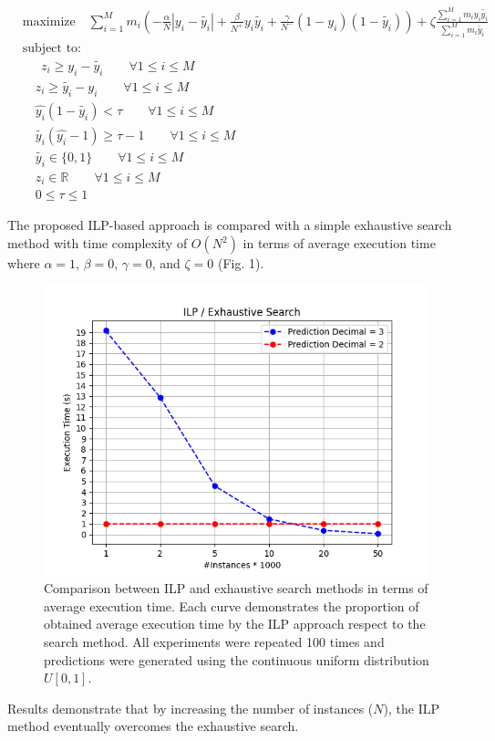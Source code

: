\documentclass[a4paper]{article}
\begin{document}
\begin{equation}
\label{improved_ilp}
\begin{aligned}
&\text{maximize} \quad \sum_{i=1}^{M} m_i \left(-\frac{\alpha}{N}|y_i -\tilde{y_i}| + \frac{\beta}{N^+} y_i \tilde{y_i} + \frac{\gamma}{N^-} (1-y_i) (1-\tilde{y_i})\right) + \zeta \frac{\sum_{i=1}^{M} m_i y_i \tilde{y_i}}{\sum_{i=1}^{M} m_i \tilde{y_i}}\\
&\text{subject to:}\\
&\quad \: \: z_i \ge y_i - \tilde{y_i} \qquad \forall 1\le i \le M \qquad\\
& \quad z_i \ge \tilde{y_i}  - y_i \qquad \forall 1\le i \le M \qquad\\
& \quad \hat{y_i} (1 - \tilde{y_i}) < \tau \qquad \forall 1\le i \le M \qquad\\
& \quad  \tilde{y_i} (\hat{y_i} - 1) \ge \tau - 1 \qquad \forall 1\le i \le M \qquad\\
& \quad \tilde{y_i} \in \{0, 1\} \qquad \forall 1\le i \le M \\
& \quad z_i \in \mathbb{R} \qquad \forall 1\le i \le M \\
& \quad  0 \le \tau \le 1
\end{aligned}
\end{equation}

The proposed ILP-based approach is compared with a simple exhaustive search method with time complexity of $O(N^2)$ in terms of average execution time where $\alpha=1$, $\beta=0$, $\gamma=0$, and $\zeta=0$ (Fig. 1).

\begin{figure}[t]
	\includegraphics[width=\columnwidth]{figure_4_temp}
	\caption{Comparison between ILP and exhaustive search methods in terms of average execution time. Each curve demonstrates the proportion of obtained average execution time by the ILP approach respect to the search method. All experiments were repeated 100 times and predictions were generated using the continuous uniform distribution $U[0, 1]$.}
\end{figure}

Results demonstrate that by increasing the number of instances ($N$), the ILP method eventually overcomes the exhaustive search.  

\printbibliography
\end{document}
